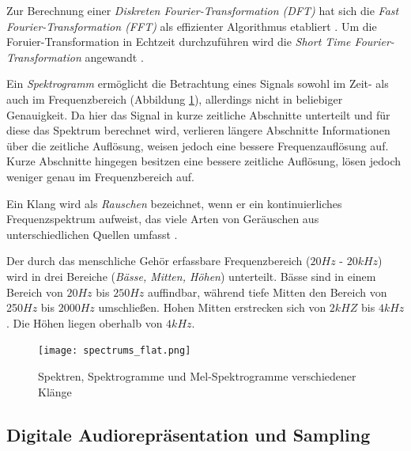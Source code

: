 \documentclass[
  a4paper,  %
  twoside,  %
  bibliography=totoc,
  headsepline,
  cleardoublepage=empty,
  parskip=half,
  draft=false
]{scrbook}
\begin{document}
Zur Berechnung einer \emph{Diskreten Fourier-Transformation (DFT)} hat sich die \emph{Fast Fourier-Transformation (FFT)} als effizienter Algorithmus etabliert \cite{heideman_gauss_1985}. Um die Foruier-Transformation in Echtzeit durchzuführen wird die \emph{Short Time Fourier-Transformation} angewandt \cite{thyagarajan_introduction_2019}. 

Ein \emph{Spektrogramm} ermöglicht die Betrachtung eines Signals sowohl im Zeit- als auch im Frequenzbereich (Abbildung \ref{fig:spectro}), allerdings nicht in beliebiger Genauigkeit. Da hier das Signal in kurze zeitliche Abschnitte unterteilt und für diese das Spektrum berechnet wird, verlieren längere Abschnitte Informationen über die zeitliche Auflösung, weisen jedoch eine bessere Frequenzauflösung auf. Kurze Abschnitte hingegen besitzen eine bessere zeitliche Auflösung, lösen jedoch weniger genau im Frequenzbereich auf. \cite{raffaseder_audiodesign_2010}

Ein Klang wird als \emph{Rauschen} bezeichnet, wenn er ein kontinuierliches Frequenzspektrum aufweist, das viele Arten von Geräuschen aus unterschiedlichen Quellen umfasst
\cite{tsuji_physics_2021}. 

Der durch das menschliche Gehör erfassbare Frequenzbereich ($20 Hz$ -  $20kHz$) wird in drei Bereiche (\emph{Bässe, Mitten, Höhen}) unterteilt. Bässe sind in einem Bereich von $20Hz$ bis $250Hz$ auffindbar, während tiefe Mitten den Bereich von 250$Hz$ bis $2000Hz$ umschließen. Hohen Mitten erstrecken sich von $2kHZ$ bis $4kHz$. Die Höhen liegen oberhalb von $4kHz$. \cite{raffaseder_audiodesign_2010}

\begin{figure}
  \centering
  \texttt{[image: spectrums\_flat.png]}
  \caption[Fourier Reihe]{Spektren, Spektrogramme und Mel-Spektrogramme verschiedener Klänge}
  \label{fig:spectro}
\end{figure}


\subsection{Digitale Audiorepräsentation und Sampling}
\end{document}
